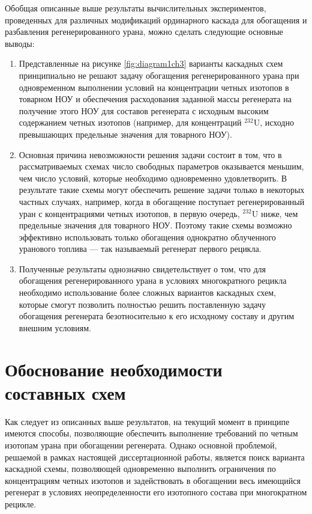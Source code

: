 Обобщая описанные выше результаты вычислительных экспериментов, проведенных для различных модификаций ординарного каскада для обогащения и разбавления регенерированного урана, можно сделать следующие основные выводы:
\begin{enumerate}
  \item Представленные на рисунке \ref{fig:diagram1ch3} варианты каскадных схем принципиально не решают задачу обогащения регенерированного урана при одновременном выполнении условий на концентрации четных изотопов в товарном НОУ и обеспечения расходования заданной массы регенерата на получение этого НОУ для составов регенерата с исходным высоким содержанием четных изотопов (например, для концентраций $^{232}$U, исходно превышающих предельные значения для товарного НОУ). 
  \item Основная причина невозможности решения задачи состоит в том, что в рассматриваемых схемах число свободных параметров оказывается меньшим, чем число условий, которые необходимо одновременно удовлетворить. В результате такие схемы могут обеспечить решение задачи только в некоторых частных случаях, например, когда в обогащение поступает регенерированный уран с концентрациями четных изотопов, в первую очередь, $^{232}$U ниже, чем предельные значения для товарного НОУ. Поэтому такие схемы возможно эффективно использовать только обогащения однократно облученного уранового топлива --- так называемый регенерат первого рецикла. 
  \item Полученные результаты однозначно свидетельствует о том, что для обогащения регенерированного урана в условиях многократного рецикла необходимо использование более сложных вариантов каскадных схем, которые смогут позволить полностью решить поставленную задачу обогащения регенерата безотносительно к его исходному составу и другим внешним условиям.
\end{enumerate}

\section{Обоснование необходимости составных схем}

Как следует из описанных выше результатов, на текущий момент в принципе имеются способы, позволяющие обеспечить выполнение требований по четным изотопам урана при обогащении регенерата. Однако основной проблемой, решаемой в рамках настоящей диссертационной работы, является поиск варианта каскадной схемы, позволяющей одновременно выполнить ограничения по концентрациям четных изотопов и задействовать в обогащении весь имеющийся регенерат в условиях неопределенности его изотопного состава при многократном рецикле.

